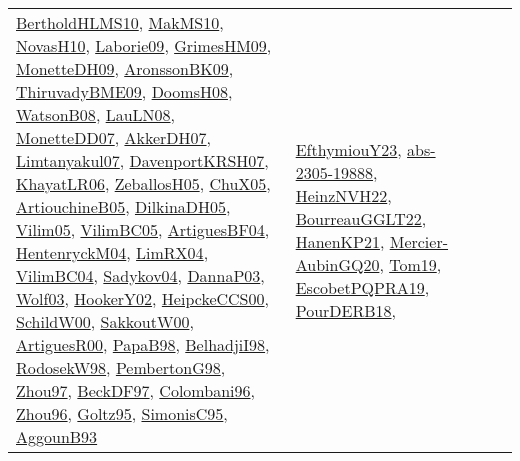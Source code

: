 {\begin{longtable}{lp{3cm}>{\raggedright}p{6cm}>{\raggedright}p{6cm}p{8cm}}
\href{papers/BertholdHLMS10.pdf}{BertholdHLMS10}\cite{BertholdHLMS10}, \href{papers/MakMS10.pdf}{MakMS10}\cite{MakMS10}, \href{articles/NovasH10.pdf}{NovasH10}\cite{NovasH10}, \href{papers/Laborie09.pdf}{Laborie09}\cite{Laborie09}, \href{papers/GrimesHM09.pdf}{GrimesHM09}\cite{GrimesHM09}, \href{papers/MonetteDH09.pdf}{MonetteDH09}\cite{MonetteDH09}, \href{papers/AronssonBK09.pdf}{AronssonBK09}\cite{AronssonBK09}, \href{papers/ThiruvadyBME09.pdf}{ThiruvadyBME09}\cite{ThiruvadyBME09}, \href{papers/DoomsH08.pdf}{DoomsH08}\cite{DoomsH08}, \href{papers/WatsonB08.pdf}{WatsonB08}\cite{WatsonB08}, \href{papers/LauLN08.pdf}{LauLN08}\cite{LauLN08}, \href{papers/MonetteDD07.pdf}{MonetteDD07}\cite{MonetteDD07}, \href{papers/AkkerDH07.pdf}{AkkerDH07}\cite{AkkerDH07}, \href{papers/Limtanyakul07.pdf}{Limtanyakul07}\cite{Limtanyakul07}, \href{papers/DavenportKRSH07.pdf}{DavenportKRSH07}\cite{DavenportKRSH07}, \href{articles/KhayatLR06.pdf}{KhayatLR06}\cite{KhayatLR06}, \href{articles/ZeballosH05.pdf}{ZeballosH05}\cite{ZeballosH05}, \href{papers/ChuX05.pdf}{ChuX05}\cite{ChuX05}, \href{papers/ArtiouchineB05.pdf}{ArtiouchineB05}\cite{ArtiouchineB05}, \href{papers/DilkinaDH05.pdf}{DilkinaDH05}\cite{DilkinaDH05}, \href{papers/Vilim05.pdf}{Vilim05}\cite{Vilim05}, \href{articles/VilimBC05.pdf}{VilimBC05}\cite{VilimBC05}, \href{papers/ArtiguesBF04.pdf}{ArtiguesBF04}\cite{ArtiguesBF04}, \href{papers/HentenryckM04.pdf}{HentenryckM04}\cite{HentenryckM04}, \href{papers/LimRX04.pdf}{LimRX04}\cite{LimRX04}, \href{papers/VilimBC04.pdf}{VilimBC04}\cite{VilimBC04}, \href{papers/Sadykov04.pdf}{Sadykov04}\cite{Sadykov04}, \href{papers/DannaP03.pdf}{DannaP03}\cite{DannaP03}, \href{papers/Wolf03.pdf}{Wolf03}\cite{Wolf03}, \href{papers/HookerY02.pdf}{HookerY02}\cite{HookerY02}, \href{articles/HeipckeCCS00.pdf}{HeipckeCCS00}\cite{HeipckeCCS00}, \href{articles/SchildW00.pdf}{SchildW00}\cite{SchildW00}, \href{articles/SakkoutW00.pdf}{SakkoutW00}\cite{SakkoutW00}, \href{articles/ArtiguesR00.pdf}{ArtiguesR00}\cite{ArtiguesR00}, \href{articles/PapaB98.pdf}{PapaB98}\cite{PapaB98}, \href{articles/BelhadjiI98.pdf}{BelhadjiI98}\cite{BelhadjiI98}, \href{papers/RodosekW98.pdf}{RodosekW98}\cite{RodosekW98}, \href{papers/PembertonG98.pdf}{PembertonG98}\cite{PembertonG98}, \href{articles/Zhou97.pdf}{Zhou97}\cite{Zhou97}, \href{papers/BeckDF97.pdf}{BeckDF97}\cite{BeckDF97}, \href{papers/Colombani96.pdf}{Colombani96}\cite{Colombani96}, \href{papers/Zhou96.pdf}{Zhou96}\cite{Zhou96}, \href{papers/Goltz95.pdf}{Goltz95}\cite{Goltz95}, \href{papers/SimonisC95.pdf}{SimonisC95}\cite{SimonisC95}, \href{articles/AggounB93.pdf}{AggounB93}\cite{AggounB93} & \href{papers/EfthymiouY23.pdf}{EfthymiouY23}\cite{EfthymiouY23}, \href{articles/abs-2305-19888.pdf}{abs-2305-19888}\cite{abs-2305-19888}, \href{articles/HeinzNVH22.pdf}{HeinzNVH22}\cite{HeinzNVH22}, \href{articles/BourreauGGLT22.pdf}{BourreauGGLT22}\cite{BourreauGGLT22}, \href{papers/HanenKP21.pdf}{HanenKP21}\cite{HanenKP21}, \href{papers/Mercier-AubinGQ20.pdf}{Mercier-AubinGQ20}\cite{Mercier-AubinGQ20}, \href{papers/Tom19.pdf}{Tom19}\cite{Tom19}, \href{articles/EscobetPQPRA19.pdf}{EscobetPQPRA19}\cite{EscobetPQPRA19}, \href{articles/PourDERB18.pdf}{PourDERB18}\cite{PourDERB18}, 
\end{longtable}}
